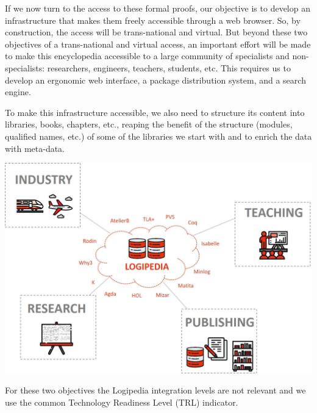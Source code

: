 If we now turn to the access to these formal proofs, our objective is
to develop an infrastructure that makes them freely accessible through
a web browser. So, by construction, the access will be trans-national
and virtual. But beyond these two objectives of a trans-national and
virtual access, an important effort will be made to make this
encyclopedia accessible to a large community of specialists and
non-specialists: researchers, engineers, teachers, students, etc.
This requires us to develop an ergonomic web interface,
a package distribution system, and a search engine.

To make this infrastructure accessible, we also need to structure its
content into libraries, books, chapters, etc., reaping the benefit of
the structure (modules, qualified names, etc.) of some of the
libraries we start with and to enrich the data with meta-data.

\bigskip
\hspace{-1cm}\includegraphics[width=\textwidth]{img/Schema}
\bigskip

For these two objectives the Logipedia integration levels are not
relevant and we use the common Technology Readiness Level (TRL) indicator.

